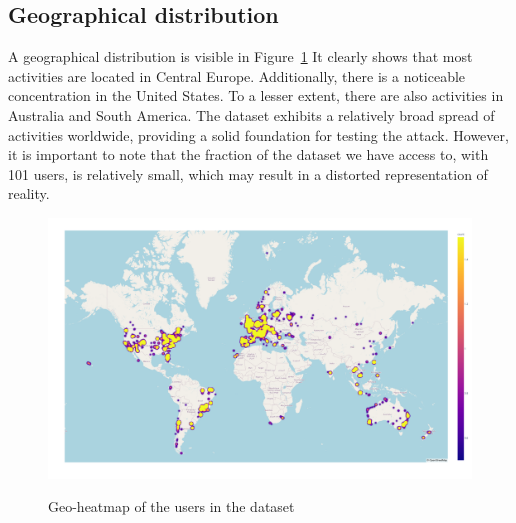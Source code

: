 \documentclass[conference]{IEEEtran}
\begin{document}
\subsection{Geographical distribution}
A geographical distribution is visible in Figure~\ref{fig:heatmap} It clearly
shows that most activities are located in Central Europe. Additionally, there
is a noticeable concentration in the United States. To a lesser extent, there
are also activities in Australia and South America. The dataset exhibits a
relatively broad spread of activities worldwide, providing a solid foundation
for testing the attack. However, it is important to note that the fraction of
the dataset we have access to, with 101 users, is relatively small, which may
result in a distorted representation of reality.
\begin{figure}[h]
    \centering
    \includegraphics[width=0.75\linewidth]{fig/Afwijkingen&Analyses/Heatmap.png}\label{fig:heatmap}
    \caption{Geo-heatmap of the users in the dataset}
\end{figure}
\end{document}

